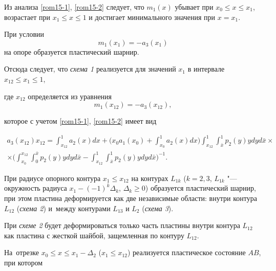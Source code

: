 Из анализа \eqref{rom15-1}, \eqref{rom15-2} следует, что $m_1(x)$ убывает при $x_0\le x\le x_1$, возрастает при $x_1\le x\le1$ и достигает минимального значения при $x=x_1$.

При условии $$m_1(x_1)=-a_3(x_1)$$ на опоре образуется пластический шарнир.

Отсюда следует, что {\sl схема 1} реализуется для значений $x_1$ в интервале $x_{12}\le x_1\le1$,

где $x_{12}$ определяется из уравнения $$m_1(x_{12})=-a_3(x_{12}),$$

которое с учетом \eqref{rom15-1}, \eqref{rom15-2} имеет вид

\begin{multline}

\label{rom16}

a_3(x_{12})x_{12}=

\int_{x_{12}}^1{a_2(x)dx}+

\biggl(

x_0a_1(x_0)+

\int_{x_0}^1 a_2(x)dx \biggr)

\int_{x_{12}}^1

\int_{\bar{x}}^1 p_2(y)y dy  d\bar{x} \times

\\

\times

\biggl(

\int_{x_0}^{x_{12}}

\int_0^{\bar{x}} p_2(y)y dy  d\bar{x}-

\int_{x_{12}}^1

\int_{\bar{x}}^1 p_2(y)y dy

 d\bar{x}\biggr)^{-1}.

\end{multline}



При радиусе опорного контура $x_1\le x_{12}$ на контурах $L_{1k}$ ($k=2, 3$, $L_{1k}$ "--- окружность радиуса $x_1-(-1)^k\Delta_k$, $\Delta_k\ge0$) образуется пластический шарнир, при этом пластина деформируется как две независимые области: внутри контура $L_{12}$ ({\sl схема 2}\/) и~между контурами $L_{13}$ и $L_2$ ({\sl схема 3}\/).



При {\sl схеме 2} будет деформироваться только часть пластины внутри контура $L_{12}$ как пластина с жесткой шайбой, защемленная по контуру $L_{12}$.

На~отрезке $x_0\le x\le x_1-\Delta_2$ ($x_1\le x_{12}$) реализуется пластическое состояние $AB$, при котором

